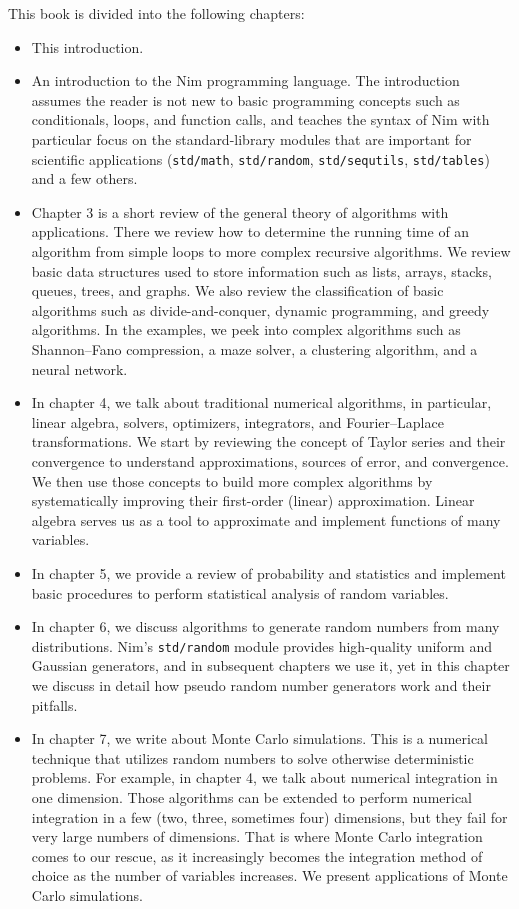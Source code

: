 \documentclass[justified, sixbynine]{tufte-book}
\def\ft{\small\tt}
\theoremstyle{plain}%
\newtheorem * {corollary}{Corollary}
\theoremstyle{definition}
\theoremstyle{remark}
\newtheorem * {remark}{Remark}
\newtheorem * {note}{Note}
\begin{document}
\begin{fullwidth}
This book is divided into the following chapters:

\begin{itemize}
\item This introduction.
\item An introduction to the Nim programming language. The introduction assumes the reader is not new to basic programming concepts such as conditionals, loops, and function calls, and teaches the syntax of Nim with particular focus on the standard-library modules that are important for scientific applications ({\ft std/math}, {\ft std/random}, {\ft std/sequtils}, {\ft std/tables}) and a few others.
\item Chapter 3 is a short review of the general theory of algorithms with applications. There we review how to determine the running time of an algorithm from simple loops to more complex recursive algorithms. We review basic data structures used to store information such as lists, arrays, stacks, queues, trees, and graphs. We also review the classification of basic algorithms such as divide-and-conquer, dynamic programming, and greedy algorithms. In the examples, we peek into complex algorithms such as Shannon--Fano compression, a maze solver, a clustering algorithm, and a neural network.
\item In chapter 4, we talk about traditional numerical algorithms, in particular, linear algebra, solvers, optimizers, integrators, and Fourier--Laplace transformations. We start by reviewing the concept of Taylor series and their convergence to understand approximations, sources of error, and convergence. We then use those concepts to build more complex algorithms by systematically improving their first-order (linear) approximation. Linear algebra serves us as a tool to approximate and implement functions of many variables.
\item In chapter 5, we provide a review of probability and statistics and implement basic procedures to perform statistical analysis of random variables.
\item In chapter 6, we discuss algorithms to generate random numbers from many distributions. Nim's {\ft std/random} module provides high-quality uniform and Gaussian generators, and in subsequent chapters we use it, yet in this chapter we discuss in detail how pseudo random number generators work and their pitfalls.
\item In chapter 7, we write about Monte Carlo simulations. This is a numerical technique that utilizes random numbers to solve otherwise deterministic problems. For example, in chapter 4, we talk about numerical integration in one dimension. Those algorithms can be extended to perform numerical integration in a few (two, three, sometimes four) dimensions, but they fail for very large numbers of dimensions. That is where Monte Carlo integration comes to our rescue, as it increasingly becomes the integration method of choice as the number of variables increases. We present applications of Monte Carlo simulations.

\end{itemize}
\end{fullwidth}
\end{document}
